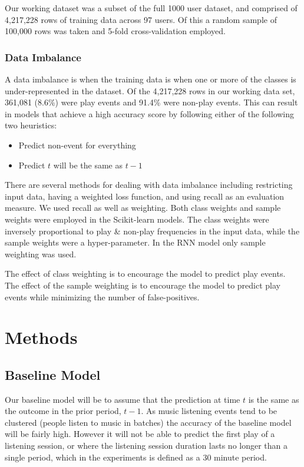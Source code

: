 Our working dataset was a subset of the full 1000 user dataset, and comprised of 4,217,228 rows of training data across 97 users. Of this a random sample of 100,000 rows was taken and 5-fold cross-validation employed.  

\subsubsection{Data Imbalance}

A data imbalance is when the training data is when one or more of the classes is under-represented in the dataset. Of the 4,217,228 rows in our working data set, 361,081 (8.6\%) were play events and 91.4\% were non-play events. This can result in models that achieve a high accuracy score by following either of the following two heuristics:

\begin{itemize}
	\item Predict non-event for everything
	\item Predict $t$ will be the same as $t-1$
\end{itemize}
 
There are several methods for dealing with data imbalance \parencite{Brownlee} including restricting input data, having a weighted loss function, and using recall as an evaluation measure. We used recall as well as weighting. Both class weights and sample weights were employed in the Scikit-learn models. The class weights were inversely proportional to play \& non-play frequencies in the input data, while the sample weights were a hyper-parameter.  In the RNN model only sample weighting was used.

The effect of class weighting is to encourage the model to predict play events. The effect of the sample weighting is to encourage the model to predict play events while minimizing the number of false-positives.

\section{Methods}

\subsection{Baseline Model}

Our baseline model will be to assume that the prediction at time $t$ is the same as the outcome in the prior period, $t-1$. As music listening events tend to be clustered (people listen to music in batches) the accuracy of the baseline model will be fairly high. However it will not be able to predict the first play of a listening session, or where the listening session duration lasts no longer than a single period, which in the experiments is defined as a 30 minute period.

